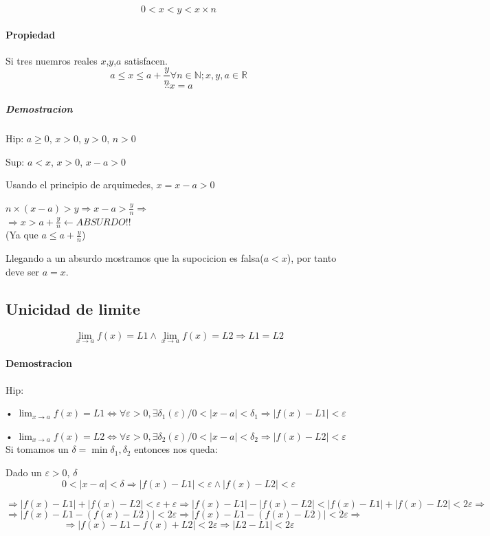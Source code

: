 $$0<x<y<x\times n$$

\paragraph{Propiedad}
	Si tres nuemros reales $x$,$y$,$a$ satisfacen.
		$$ a \leq x \leq a + \frac{y}{n}  \forall n \in \mathbb{N}; x,y,a \in \mathbb{R}$$
		$$\therefore x=a$$
\subparagraph{Demostracion}

Hip: $a\geq 0$, $x>0$, $y>0$, $n>0$

Sup: $a<x$, $x>0$, $x-a>0$

Usando el principio de arquimedes, $x=x-a>0$
\begin{center}
$n\times (x-a)>y \Rightarrow x-a > \frac{y}{n} \Rightarrow $\\
$\Rightarrow x>a+\frac{y}{n} \leftarrow ABSURDO!!$\\
(Ya que $ a\leq a + \frac{y}{n}$)\\
\end{center}

Llegando a un absurdo mostramos que la supocicion es falsa($a<x$), por tanto deve ser $a=x$. 

\subsection{Unicidad de limite}

$$\lim_{x\rightarrow a}{f(x)}=L1 \wedge \lim_{x\rightarrow a}{f(x)}=L2 \Rightarrow L1=L2$$
\paragraph{Demostracion}

Hip:

• $\lim_{x \rightarrow a}{f(x)}=L1 \Leftrightarrow \forall \varepsilon >0, \exists \delta _1 (\varepsilon) / 0<|x-a|<\delta _1 \Rightarrow |f(x)-L1|<\varepsilon$

• $\lim_{x \rightarrow a}{f(x)}=L2 \Leftrightarrow \forall \varepsilon >0, \exists \delta _2 (\varepsilon) / 0<|x-a|<\delta _2 \Rightarrow |f(x)-L2|<\varepsilon$\\

Si tomamos un $\delta = \min {\delta _1, \delta _2}$ entonces nos queda:

Dado un $\varepsilon>0$, $\delta$
$$0<|x-a|<\delta \Rightarrow |f(x)-L1|<\varepsilon \wedge |f(x)-L2|<\varepsilon$$
\begin{center}
\end{center}
$$\Rightarrow |f(x)-L1|+|f(x)-L2| < \varepsilon + \varepsilon \Rightarrow |f(x)-L1|-|f(x)-L2|<|f(x)-L1|+|f(x)-L2|< 2\varepsilon \Rightarrow$$
$$\Rightarrow |f(x)-L1-(f(x)-L2)|<2\varepsilon \Rightarrow |f(x)-L1-(f(x)-L2)|<2\varepsilon \Rightarrow$$
$$\Rightarrow |f(x)-L1- f(x)+L2|< 2\varepsilon \Rightarrow |L2-L1|< 2\varepsilon$$

